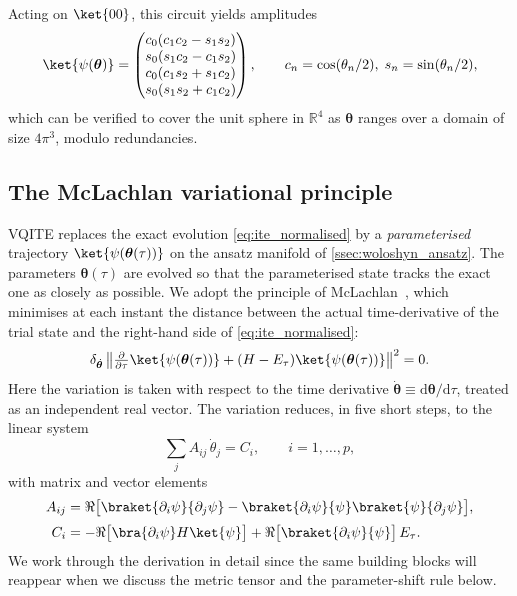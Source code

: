 Acting on $\ket{00}$, this circuit yields amplitudes
\begin{equation}
  \label{eq:direct_ansatz_state}
  \ket{\psi(\bm{\theta})} =
  \begin{pmatrix}
    c_0(c_1 c_2 - s_1 s_2)\\
    s_0(s_1 c_2 - c_1 s_2)\\
    c_0(c_1 s_2 + s_1 c_2)\\
    s_0(s_1 s_2 + c_1 c_2)
  \end{pmatrix},
  \qquad
  c_n = \cos(\theta_n/2),\; s_n = \sin(\theta_n/2),
\end{equation}
which can be verified to cover the unit sphere in $\mathbb{R}^{4}$ as
$\bm{\theta}$ ranges over a domain of size $4\pi^{3}$, modulo redundancies.

\subsection{The McLachlan variational principle}
\label{ssec:mclachlan}

VQITE replaces the exact evolution \cref{eq:ite_normalised} by a
\emph{parameterised} trajectory $\ket{\psi(\bm{\theta}(\tau))}$ on the
ansatz manifold of \cref{ssec:woloshyn_ansatz}. The parameters
$\bm{\theta}(\tau)$ are evolved so that the parameterised state tracks
the exact one as closely as possible. We adopt the principle of
McLachlan~\cite{mclachlan1964}, which minimises at each instant the
distance between the actual time-derivative of the trial state and the
right-hand side of \cref{eq:ite_normalised}:
\begin{equation}
  \label{eq:mclachlan}
  \delta_{\dot{\bm{\theta}}}\,
  \bigl\| \tfrac{\partial}{\partial\tau}\ket{\psi(\bm{\theta}(\tau))}
        + (H - E_\tau)\ket{\psi(\bm{\theta}(\tau))} \bigr\|^{2} = 0.
\end{equation}
Here the variation is taken with respect to the time derivative
$\dot{\bm{\theta}} \equiv \mathrm{d}\bm{\theta}/\mathrm{d}\tau$, treated
as an independent real vector. The variation reduces, in five short
steps, to the linear system
\begin{equation}
  \label{eq:mclachlan_linsys}
  \sum_j A_{ij}\,\dot{\theta}_j = C_i,
  \qquad i = 1,\ldots,p,
\end{equation}
with matrix and vector elements
\begin{align}
  \label{eq:mclachlan_A}
  A_{ij} &= \Re\bigl[
    \braket{\partial_i\psi}{\partial_j\psi}
    - \braket{\partial_i\psi}{\psi}\braket{\psi}{\partial_j\psi}
  \bigr],\\[2pt]
  \label{eq:mclachlan_C}
  C_i &= -\Re\bigl[\bra{\partial_i\psi} H \ket{\psi}\bigr]
       + \Re\bigl[\braket{\partial_i\psi}{\psi}\bigr]\,E_\tau.
\end{align}
We work through the derivation in detail since the same building blocks
will reappear when we discuss the metric tensor and the parameter-shift
rule below.

